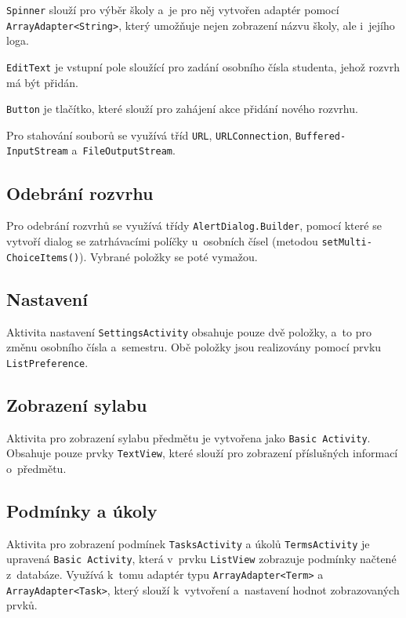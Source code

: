 \documentclass[12pt, a4paper]{article}
\begin{document}
		\texttt{Spinner} slouží pro výběr školy a~je pro něj vytvořen adaptér pomocí \texttt{ArrayAdapter\textless String\textgreater}, který umožňuje nejen zobrazení názvu školy, ale i~jejího loga.
		
		\texttt{EditText} je vstupní pole sloužící pro zadání osobního čísla studenta, jehož rozvrh má být přidán.
		
		\texttt{Button} je tlačítko, které slouží pro zahájení akce přidání nového rozvrhu.
		
		Pro stahování souborů se využívá tříd \texttt{URL}, \texttt{URLConnection}, \texttt{Buffered-\\InputStream} a~\texttt{FileOutputStream}.
		
		\subsection{Odebrání rozvrhu}
		Pro odebrání rozvrhů se využívá třídy \texttt{AlertDialog.Builder}, pomocí které se vytvoří dialog se zatrhávacími políčky u~osobních čísel (metodou \texttt{setMulti-\\ChoiceItems()}). Vybrané položky se poté vymažou.
		
		\subsection{Nastavení}
		Aktivita nastavení \texttt{SettingsActivity} obsahuje pouze dvě položky, a~to pro změnu osobního čísla a~semestru. Obě položky jsou realizovány pomocí prvku \texttt{ListPreference}.
		
		\subsection{Zobrazení sylabu}
		Aktivita pro zobrazení sylabu předmětu je vytvořena jako \texttt{Basic Activity}. Obsahuje pouze prvky \texttt{TextView}, které slouží pro zobrazení příslušných informací o~předmětu.
		
		\subsection{Podmínky a úkoly}
		Aktivita pro zobrazení podmínek \texttt{TasksActivity} a úkolů \texttt{TermsActivity} je upravená \texttt{Basic Activity}, která v~prvku \texttt{ListView} zobrazuje podmínky načtené z~databáze. Využívá k~tomu adaptér typu \texttt{ArrayAdapter\textless Term\textgreater} a \texttt{ArrayAdapter\textless Task\textgreater}, který slouží k~vytvoření a~nastavení hodnot zobrazovaných prvků.
		
\end{document}
